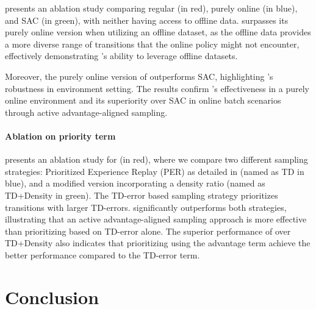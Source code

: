  presents an ablation study comparing regular \algname (in \textcolor{myred}{red}), purely online \algname (in \textcolor{myblue}{blue}), and SAC (in \textcolor{mygreen}{green}), with neither having access to offline data. \algname surpasses its purely online version when utilizing an offline dataset, as the offline data provides a more diverse range of transitions that the online policy might not  encounter, effectively demonstrating \algname's ability to leverage offline datasets. 

Moreover, the purely online version of \algname outperforms SAC, highlighting \algname's robustness in environment setting. The results confirm \algname's effectiveness in a purely online environment and its superiority over SAC in online batch scenarios through active advantage-aligned sampling.





\paragraph{Ablation on priority term}



 presents an ablation study for \algname (in \textcolor{myred}{red}), where we compare two different sampling strategies: Prioritized Experience Replay (PER) as detailed in \citep{schaul2015prioritized} (named as TD in \textcolor{myblue}{blue}), and a modified version incorporating a density ratio (named as TD+Density in \textcolor{mygreen}{green}). The TD-error based sampling strategy prioritizes transitions with larger TD-errors. \algname significantly outperforms both strategies, illustrating that an active advantage-aligned sampling approach is more effective than prioritizing based on TD-error alone. The superior performance of \algname over TD+Density also indicates that prioritizing using the advantage term achieve the better performance compared to the TD-error term.

















\section{Conclusion}

